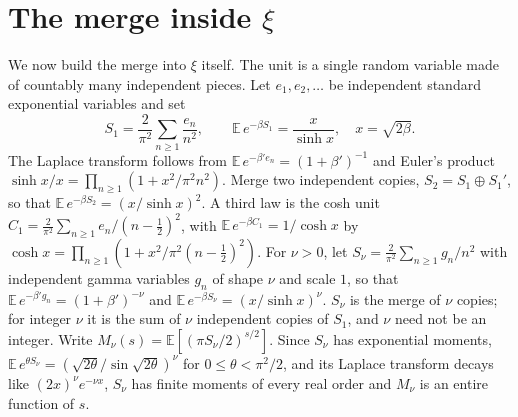 \documentclass[11pt]{article}
\theoremstyle{definition}\newtheorem{definition}[theorem]{Definition}
\theoremstyle{remark}\newtheorem{remark}[theorem]{Remark}
\begin{document}
\section{The merge inside \texorpdfstring{$\xi$}{xi}}\label{sec:xi}
We now build the merge into $\xi$ itself. The unit is a single random variable made of countably many independent pieces. Let $e_1,e_2,\dots$ be independent standard exponential variables and set
\[
S_1=\frac2{\pi^2}\sum_{n\ge1}\frac{e_n}{n^2},\qquad \mathbb E\,e^{-\beta S_1}=\frac{x}{\sinh x},\quad x=\sqrt{2\beta}.
\]
The Laplace transform follows from $\mathbb E\,e^{-\beta' e_n}=(1+\beta')^{-1}$ and Euler's product $\sinh x/x=\prod_{n\ge1}(1+x^2/\pi^2n^2)$. Merge two independent copies, $S_2=S_1\oplus S_1'$, so that $\mathbb E\,e^{-\beta S_2}=(x/\sinh x)^2$. A third law is the cosh unit $C_1=\frac2{\pi^2}\sum_{n\ge1}e_n/(n-\frac12)^2$, with $\mathbb E\,e^{-\beta C_1}=1/\cosh x$ by $\cosh x=\prod_{n\ge1}(1+x^2/\pi^2(n-\frac12)^2)$. For $\nu>0$, let $S_\nu=\frac2{\pi^2}\sum_{n\ge1}g_n/n^2$ with independent gamma variables $g_n$ of shape $\nu$ and scale $1$, so that $\mathbb E\,e^{-\beta' g_n}=(1+\beta')^{-\nu}$ and $\mathbb E\,e^{-\beta S_\nu}=(x/\sinh x)^\nu$. $S_\nu$ is the merge of $\nu$ copies; for integer $\nu$ it is the sum of $\nu$ independent copies of $S_1$, and $\nu$ need not be an integer. Write $M_\nu(s)=\mathbb E[(\pi S_\nu/2)^{s/2}]$. Since $S_\nu$ has exponential moments, $\mathbb E\,e^{\theta S_\nu}=(\sqrt{2\theta}/\sin\sqrt{2\theta})^\nu$ for $0\le\theta<\pi^2/2$, and its Laplace transform decays like $(2x)^\nu e^{-\nu x}$, $S_\nu$ has finite moments of every real order and $M_\nu$ is an entire function of $s$.
\end{document}
